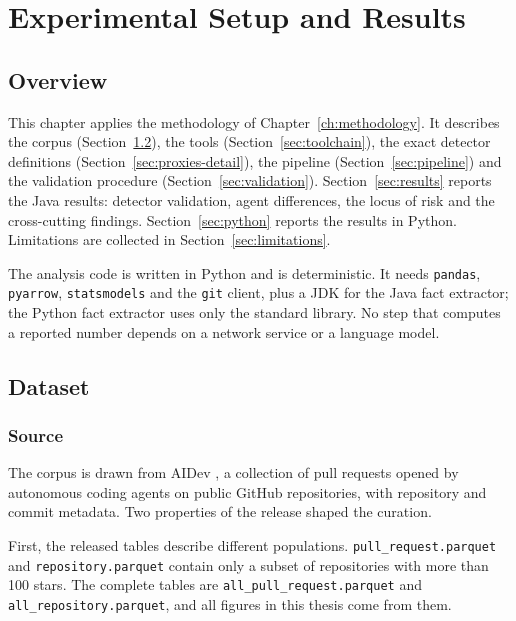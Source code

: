 \chapter{Experimental Setup and Results}
\label{ch:results}
\newpage

\section{Overview}
\label{sec:ch4-overview}

This chapter applies the methodology of Chapter~\ref{ch:methodology}. It describes the corpus
(Section~\ref{sec:dataset}), the tools (Section~\ref{sec:toolchain}), the exact detector definitions
(Section~\ref{sec:proxies-detail}), the pipeline (Section~\ref{sec:pipeline}) and the validation
procedure (Section~\ref{sec:validation}). Section~\ref{sec:results} reports the Java results:
detector validation, agent differences, the locus of risk and the cross-cutting findings.
Section~\ref{sec:python} reports the results in Python. Limitations are collected in
Section~\ref{sec:limitations}.

The analysis code is written in Python and is deterministic. It needs \texttt{pandas},
\texttt{pyarrow}, \texttt{statsmodels} and the \texttt{git} client, plus a JDK for the Java fact
extractor; the Python fact extractor uses only the standard library. No step that computes a
reported number depends on a network service or a language model.

\section{Dataset}
\label{sec:dataset}

\subsection{Source}

The corpus is drawn from AIDev \citep{li2025aidev}, a collection of pull requests opened by
autonomous coding agents on public GitHub repositories, with repository and commit metadata. Two
properties of the release shaped the curation.

\begin{sloppypar}
First, the released tables describe different populations. \texttt{pull\_request.parquet} and
\texttt{repository.parquet} contain only a subset of repositories with more than 100 stars. The
complete tables are \texttt{all\_pull\_request.parquet} and \texttt{all\_repository.parquet}, and
all figures in this thesis come from them.
\end{sloppypar}

